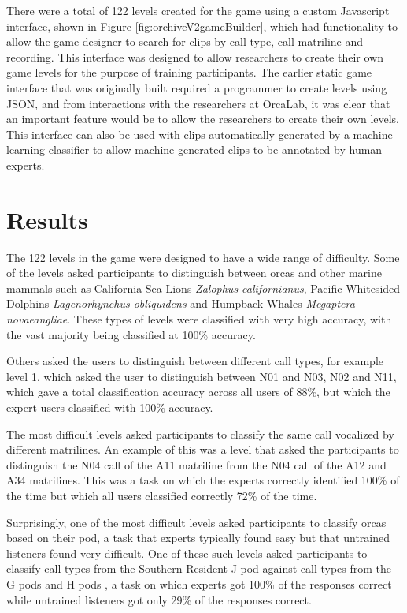There were a total of 122 levels created for the game using a custom
Javascript interface, shown in Figure \ref{fig:orchiveV2gameBuilder},
which had functionality to allow the game designer to search for clips
by call type, call matriline and recording.  This interface was
designed to allow researchers to create their own game levels for the
purpose of training participants.  The earlier static game interface
that was originally built required a programmer to create levels using
JSON, and from interactions with the researchers at OrcaLab, it was
clear that an important feature would be to allow the researchers to
create their own levels.  This interface can also be used with clips
automatically generated by a machine learning classifier to allow
machine generated clips to be annotated by human experts.

\section{Results}

The 122 levels in the game were designed to have a wide range of
difficulty.  Some of the levels asked participants to distinguish
between orcas and other marine mammals such as California Sea Lions
\textit{Zalophus californianus}, Pacific Whitesided Dolphins
\textit{Lagenorhynchus obliquidens} and Humpback Whales
\textit{Megaptera novaeangliae}.  These types of levels were
classified with very high accuracy, with the vast majority being
classified at 100\% accuracy.

Others asked the users to distinguish between different call types,
for example level 1, which asked the user to distinguish between N01
and N03, N02 and N11, which gave a total classification accuracy
across all users of 88\%, but which the expert users classified with
100\% accuracy.

The most difficult levels asked participants to classify the same call
vocalized by different matrilines.  An example of this was a level
that asked the participants to distinguish the N04 call of the A11
matriline from the N04 call of the A12 and A34 matrilines.  This was a
task on which the experts correctly identified 100\% of the time but
which all users classified correctly 72\% of the time.

Surprisingly, one of the most difficult levels asked participants to
classify orcas based on their pod, a task that experts typically found
easy but that untrained listeners found very difficult.  One of these
such levels asked participants to classify call types from the
Southern Resident J pod against call types from the G pods and H pods
, a task on which experts got 100\% of the responses correct while
untrained listeners got only 29\% of the responses correct.

